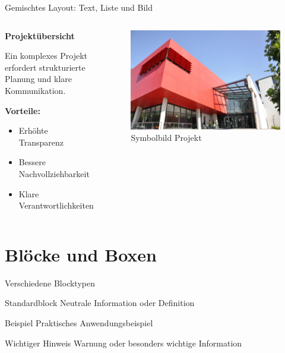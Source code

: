 \documentclass[aspectratio=169,10pt]{beamer}
\begin{document}
\begin{frame}{Gemischtes Layout: Text, Liste und Bild}
\begin{columns}[T]
  \begin{column}{0.55\textwidth}
    \textbf{Projektübersicht}
    
    \vspace{0.3cm}
    Ein komplexes Projekt erfordert strukturierte Planung und klare Kommunikation.
    
    \vspace{0.3cm}
    \textbf{Vorteile:}
    \begin{itemize}
      \item Erhöhte Transparenz
      \item Bessere Nachvollziehbarkeit
      \item Klare Verantwortlichkeiten
    \end{itemize}
  \end{column}
  \begin{column}{0.4\textwidth}
    \begin{figure}
      \centering
      \includegraphics[width=\textwidth]{assets/dm_roter_wuerfel_ben_steinig.jpg}
      \caption{Symbolbild Projekt}
    \end{figure}
  \end{column}
\end{columns}
\end{frame}

\section{Blöcke und Boxen}
\begin{frame}{Verschiedene Blocktypen}
\begin{block}{Standardblock}
  Neutrale Information oder Definition
\end{block}

\begin{exampleblock}{Beispiel}
  Praktisches Anwendungsbeispiel
\end{exampleblock}

\begin{alertblock}{Wichtiger Hinweis}
  Warnung oder besonders wichtige Information
\end{alertblock}
\end{frame}
\end{document}
